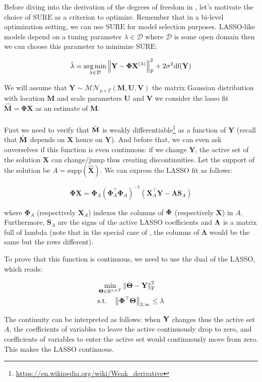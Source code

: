 \documentclass[a4paper,10pt]{article}
\theoremstyle{definition}
\begin{document}
Before diving into the derivation of the degrees of freedom in , let's motivate the choice of $\text{SURE}$ as a criterion
to optimize. Remember that in a bi-level optimization setting, we can use $\text{SURE}$ for model selection purposes. LASSO-like
models depend on a tuning parameter $\lambda \in \mathcal{D}$ where $\mathcal{D}$ is some open domain then we can choose this parameter to
minimize $\text{SURE}$:

\begin{equation*}
    \hat{\lambda} = \operatorname*{arg\,min}_{\lambda \in \mathcal{D}} \left \lVert  \mathbf{Y} - \mathbf{\Phi}\mathbf{X}^{(\lambda)} \right \rVert_{\text{F}}^2 + 2 \sigma^2 \text{df}(\bf{Y})
\end{equation*}

We will assume that $\mathbf{Y} \sim \mathcal{MN}_{p\times T}(\mathbf{M}, \mathbf{U}, \mathbf{V})$ the matrix Gaussian distribution with location $\mathbf{M}$
and scale parameters $\mathbf{U}$ and $\mathbf{V}$ we consider the lasso fit $\mathbf{\hat{M} = \Phi X}$ as an estimate of $\mathbf{M}$.
\\
\\
First we need to verify that $\hat{\bf{M}}$ is weakly differentiable\footnote{\url{https://en.wikipedia.org/wiki/Weak_derivative}} as a function of $\mathbf{Y}$
(recall that $\hat{\bf{M}}$ depends on $\mathbf{X}$ hence on $\mathbf{Y}$). And before that, we can even ask ouverselves if this function is even continuous: if
we change $\mathbf{Y}$, the active set of the solution $\mathbf{X}$ can change/jump thus creating discontinuities. Let the support of the solution be $A = \text{supp}(\hat{\mathbf{X}})$.
We can express the LASSO fit as follows:

\begin{equation*}
    \mathbf{\Phi X} = \mathbf{\Phi}_A(\mathbf{\Phi}_A^{\top}\mathbf{\Phi}_A)^{-1}(\mathbf{X}^{\top}_A\mathbf{Y} - \mathbf{\Lambda}\mathbf{S}_A)
\end{equation*}

where $\mathbf{\Phi}_A$ (respectively $\mathbf{X}_A$) indexes the columns of $\bf\Phi$ (respectively $\mathbf{X}$) in $A$. Furthermore, $\mathbf{S}_A$ are the signs of the active
LASSO coefficients and $\bf\Lambda$ is a matrix full of lambda (note that in the special case of , the columns of $\mathbf{\Lambda}$ would be the same but the rows
different).

To prove that this function is continuous, we need to use the dual of the LASSO, which reads:

\begin{align*}
    &\min_{\mathbf{\Theta} \in \mathbb{R}^{n \times T}} \left \lVert  \mathbf{\Theta} - \mathbf{Y}  \right \rVert_{\text{F}}^2 \\
    &\text{s.t.} \quad \left \lVert \mathbf{\Phi^{\top}\Theta} \right \rVert_{2, \infty} \leq \lambda
\end{align*}


The continuity can be interpreted as follows: when $\mathbf{Y}$ changes thus the active set $A$, the coefficients of variables to leave
the active continuously drop to zero, and coefficients of variables to enter the active set would continuously move from zero. This makes the LASSO continuous.


\newpage


\end{document}
